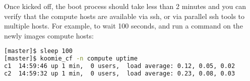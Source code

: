 \documentclass[letterpaper]{article}
\begin{document}

\vspace*{0.25cm}
Once kicked off, the boot process should take less than 2 minutes and you can
verify that the compute hosts are available via ssh, or via parallel ssh tools to multiple
hosts. For example, to wait 100 seconds, and run a command on the newly images
compute hosts:


\vspace*{0.25cm}
\begin{lstlisting}[language=bash]
[master]$ sleep 100
[master]$ koomie_cf -n compute uptime
c1  14:59:46 up 1 min,  0 users,  load average: 0.12, 0.05, 0.02
c2  14:59:32 up 1 min,  0 users,  load average: 0.23, 0.08, 0.03
\end{lstlisting}

\end{document}
